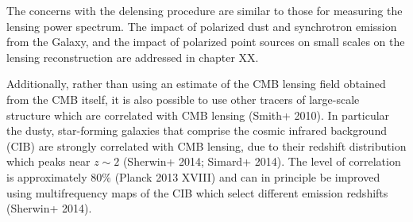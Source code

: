 The concerns with the delensing procedure are similar to those for measuring the lensing power spectrum. The impact of polarized dust and synchrotron emission from the Galaxy, and the impact of polarized point sources on small scales on the lensing reconstruction are addressed in chapter XX. 

Additionally, rather than using an estimate of the CMB lensing field obtained from the CMB itself, it is also possible to use other tracers of large-scale structure which are correlated with  CMB lensing (Smith+ 2010).  In particular the dusty, star-forming galaxies that comprise the cosmic infrared background (CIB) are strongly correlated with CMB lensing, due to their redshift distribution which peaks near $z \sim 2$ (Sherwin+ 2014; Simard+ 2014).  The level of correlation is approximately $80\%$ (Planck 2013 XVIII) and can in principle be improved using multifrequency maps of the CIB which select different emission redshifts (Sherwin+ 2014).  


